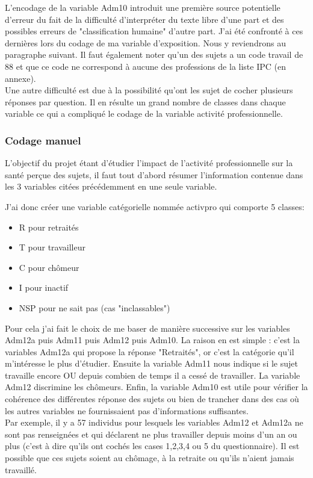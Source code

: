 \documentclass{book}
\begin{document}
\noindent
L'encodage de la variable Adm10 introduit une première source potentielle d'erreur du fait de la difficulté d'interpréter du texte libre d'une part et des possibles erreurs de "classification humaine" d'autre part. J'ai été confronté à ces dernières lors du codage de ma variable d'exposition. Nous y reviendrons au paragraphe suivant. Il faut également noter qu'un des sujets a un code travail de 88 et que ce code ne correspond à aucune des professions de la liste IPC (en annexe).\\

\noindent
Une autre difficulté est due à la possibilité qu'ont les sujet de cocher plusieurs réponses par question. Il en résulte un grand nombre de classes dans chaque variable ce qui a compliqué le codage de la variable activité professionnelle.

\subsubsection{Codage manuel}
\noindent
L'objectif du projet étant d'étudier l'impact de l'activité professionnelle sur la santé perçue des sujets, il faut tout d'abord résumer l'information contenue dans les 3 variables citées précédemment en une seule variable.

\noindent
J'ai donc créer une variable catégorielle nommée activpro qui comporte 5 classes:
\begin{itemize}[label=\textbullet, font=\small \color{black} ]
\item R pour retraités
\item T pour travailleur
\item C pour chômeur
\item I pour inactif
\item NSP pour ne sait pas (cas "inclassables")
\end{itemize}

\noindent
Pour cela j'ai fait le choix de me baser de manière successive sur les variables Adm12a puis Adm11 puis Adm12 puis Adm10. La raison en est simple : c'est la variables Adm12a qui propose la réponse "Retraités", or c'est la catégorie qu'il m'intéresse le plus d'étudier. Ensuite la variable Adm11 nous indique si le sujet travaille encore OU depuis combien de temps il a cessé de travailler. La variable Adm12 discrimine les chômeurs. Enfin, la variable Adm10 est utile pour vérifier la cohérence des différentes réponse des sujets ou bien de trancher dans des cas où les autres variables ne fournissaient pas d'informations suffisantes.\\
Par exemple, il y a 57 individus pour lesquels les variables Adm12 et Adm12a ne sont pas renseignées et qui déclarent ne plus travailler depuis moins d'un an ou plus (c'est à dire qu'ils ont cochés les cases 1,2,3,4 ou 5 du questionnaire). Il est possible que ces sujets soient au chômage, à la retraite ou qu'ils n'aient jamais travaillé.\\
\newline
\end{document}
